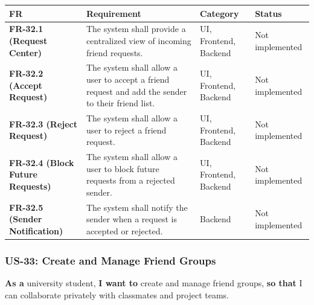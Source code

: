 \documentclass[12pt]{article}
\renewcommand{\baselinestretch}{1.5}
\begin{document}
\begingroup
\small
\renewcommand{\baselinestretch}{1.0}\selectfont
\renewcommand{\arraystretch}{1.15}
\setlength{\tabcolsep}{6pt}
\begin{longtable}{|>{\raggedright\arraybackslash}p{}|>{\raggedright\arraybackslash}p{}|>{\raggedright\arraybackslash}p{}|>{\raggedright\arraybackslash}p{}|}
\hline
\textbf{FR} & \textbf{Requirement} & \textbf{Category} & \textbf{Status} \\ \hline
\endhead
\textbf{FR-32.1 (Request Center)} & The system shall provide a centralized view of incoming friend requests. & UI, Frontend, Backend & Not implemented \\ \hline
\textbf{FR-32.2 (Accept Request)} & The system shall allow a user to accept a friend request and add the sender to their friend list. & UI, Frontend, Backend & Not implemented \\ \hline
\textbf{FR-32.3 (Reject Request)} & The system shall allow a user to reject a friend request. & UI, Frontend, Backend & Not implemented \\ \hline
\textbf{FR-32.4 (Block Future Requests)} & The system shall allow a user to block future requests from a rejected sender. & UI, Frontend, Backend & Not implemented \\ \hline
\textbf{FR-32.5 (Sender Notification)} & The system shall notify the sender when a request is accepted or rejected. & Backend & Not implemented \\ \hline
\end{longtable}
\endgroup
\par\medskip

\hypertarget{sec:us-33-create-and-manage-friend-groups}{}
\subsubsection*{US-33: Create and Manage Friend Groups}
\par\medskip

\textbf{As a} university student, \textbf{I want to} create and manage friend groups, \textbf{so that} I can collaborate privately with classmates and project teams.
\par\medskip
\end{document}
